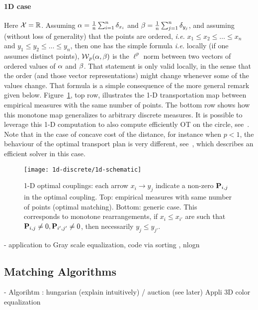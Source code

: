 \paragraph{1D case}

Here $\X=\RR$. Assuming $\al = \frac{1}{n}\sum_{i=1}^n \de_{x_i}$ and $\be = \frac{1}{n}\sum_{j=1}^n \de_{y_j}$, and assuming (without loss of generality) that the points are ordered, \emph{i.e.} $x_1 \leq x_2 \leq \ldots \leq x_n$ and $y_1 \leq y_2 \leq \ldots \leq y_n$, then one has the simple formula
\emph{i.e.} locally (if one assumes distinct points), $\Wass_p(\al,\be)$ is the $\ell^p$ norm between two vectors of ordered values of $\al$ and $\be$. That statement is only valid locally, in the sense that the order (and those vector representations) might change whenever some of the values change. That formula is a simple consequence of the more general remark given below. 
%
Figure~\ref{fig-1d-discrete}, top row, illustrates the 1-D transportation map between empirical measures with the same number of points. 
 The bottom row shows how this monotone map generalizes to arbitrary discrete measures. 
%
It is possible to leverage this 1-D computation to also compute efficiently OT on the circle, see~\cite{delon-circle}.  
%
Note that in the case of concave cost of the distance, for instance when $p<1$, the behaviour of the optimal transport plan is very different, see~\cite{delon-concave}, which describes an efficient solver in this case.



\begin{figure}
\centering
\texttt{[image: 1d-discrete/1d-schematic]}
\caption{\label{fig-1d-discrete}
1-D optimal couplings: each arrow $x_i \rightarrow y_j$ indicate a non-zero $\P_{i,j}$ in the optimal coupling.
% 
Top: empirical measures with same number of points (optimal matching).
Bottom: generic case. 
%
This corresponds to monotone rearrangements, if $x_i \leq x_{i'}$ are such that $\P_{i,j} \neq 0, \P_{i',j'} \neq 0$, then necessarily $y_j \leq y_{j'}$.
}
\end{figure}


- application to  Gray scale equalization, code via sorting , nlogn

\subsection{Matching Algorithms}

- Algorihtm : hungarian (explain intuitively) / auction (see later)
  Appli 3D color equalization